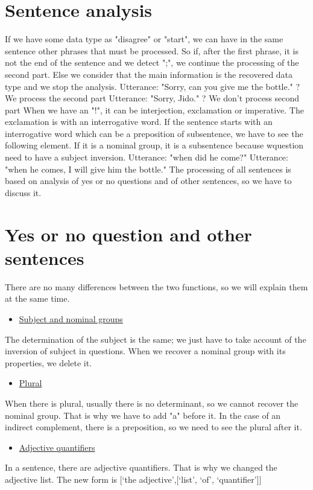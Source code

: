 \documentclass[twoside,a4paper,10pt]{report}
\newcommand{\dokutitleleveltree}[1]{\section{#1}}
\newcommand{\dokuunderline}[1]{\underline{#1}}
\newcommand{\dokuitem}{\item}
\begin{document}
\dokutitleleveltree{Sentence analysis}
\label{32c0b571d3057222f6d267b69785af3c}%
If we have some data type as "disagree" or "start", we can have in the same sentence other phrases that must be processed. So if, after the first phrase, it is not the end of the sentence and we detect ";", we continue the processing of the second part. Else we consider that the main information is the recovered data type and we stop the analysis.
Utterance: "Sorry, can you give me the bottle." ? We process the second part
Utterance: "Sorry, Jido." ? We don't process second part
When we have an "!", it can be interjection, exclamation or imperative. The exclamation is with an interrogative word.
If the sentence starts with an interrogative word which can be a preposition of subsentence, we have to see the following element. If it is a nominal group, it is a subsentence because w{\textunderscore}question need to have a subject inversion.
Utterance: "when did he come?"
Utterance: "when he comes, I will give him the bottle."
The processing of all sentences is based on analysis of yes or no questions and of other sentences, so we have to discuss it.


\dokutitleleveltree{Yes or no question and other sentences}
\label{b250d357238309c118ecc37bb80c574b}%
There are no many differences between the two functions, so we will explain them at the same time.



\begin{itemize}
\dokuitem  \dokuunderline{Subject and nominal groups}
\end{itemize}
The determination of the subject is the same; we just have to take account of the inversion of subject in questions.
When we recover a nominal group with its properties, we delete it.



\begin{itemize}
\dokuitem  \dokuunderline{Plural}
\end{itemize}
When there is plural, usually there is no determinant, so we cannot recover the nominal group. That is why we have to add "a" before it. In the case of an indirect complement, there is a preposition, so we need to see the plural after it.



\begin{itemize}
\dokuitem  \dokuunderline{Adjective quantifiers}
\end{itemize}
In a sentence, there are adjective quantifiers. That is why we changed the adjective list. The new form is [‘the adjective’,[‘list’, ‘of’, ‘quantifier’]]
\end{document}
